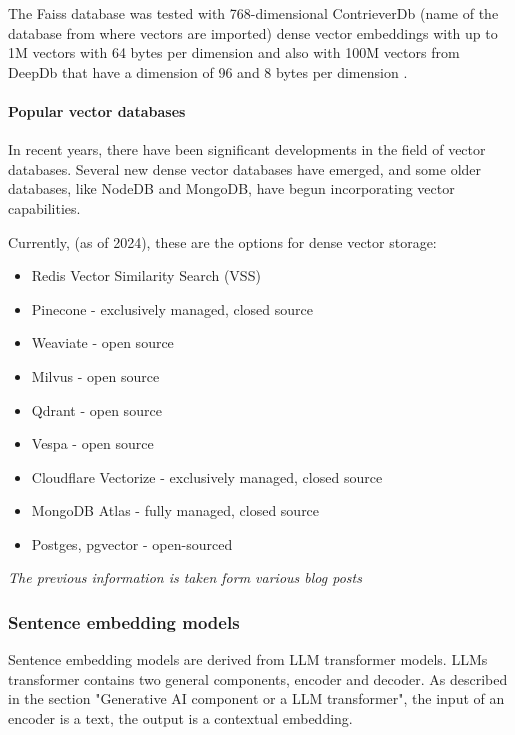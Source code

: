 \documentclass{wseas}
\begin{document}
The Faiss database was tested with 768-dimensional ContrieverDb 
(name of the database from where vectors are imported) dense vector embeddings
with up to 1M vectors with 64 bytes per dimension and also with 100M vectors 
from DeepDb that have a dimension of 96 and 8 bytes per dimension \cite{the_faiss_library}.

\paragraph{Popular vector databases}

In recent years, there have been significant developments in the field
of vector databases. Several new dense vector databases have emerged,
and some older databases, like NodeDB and MongoDB, have begun
incorporating vector capabilities.

Currently, (as of 2024), these are the options for dense vector storage:

\begin{itemize}
\item
  Redis Vector Similarity Search (VSS)
\item
  Pinecone - exclusively managed, closed source
\item
  Weaviate - open source
\item
  Milvus - open source
\item
  Qdrant - open source
\item
  Vespa - open source
\item
  Cloudflare Vectorize - exclusively managed, closed source
\item
  MongoDB Atlas - fully managed, closed source
\item
  Postges, pgvector - open-sourced
\end{itemize}

\emph{The previous information is taken form various blog posts} \cite{website_MediumGuideonRAGDatabases} \cite{Website_CloudflareGuideonVectorInsertion}\cite{website_AporiaGuideonVectorDatabasesforRAG} 
\cite{website_DatabricksGlossaryonRAG} \cite{website_MongoDBAtlasCLIDocumentation}\cite{website_MediumGuideonRAGwithAtlas} \cite{website_Neo4jBlogOnLangchainVectorIndex} \cite{website_PondhouseGuideOnAdvancedRAG}

\subsubsection{Sentence embedding models}

Sentence embedding models are derived from LLM transformer models. LLMs
transformer contains two general components, encoder and decoder. As
described in the section "Generative AI component or a LLM
transformer", the input of an encoder is a text, the output is a
contextual embedding.
\end{document}
